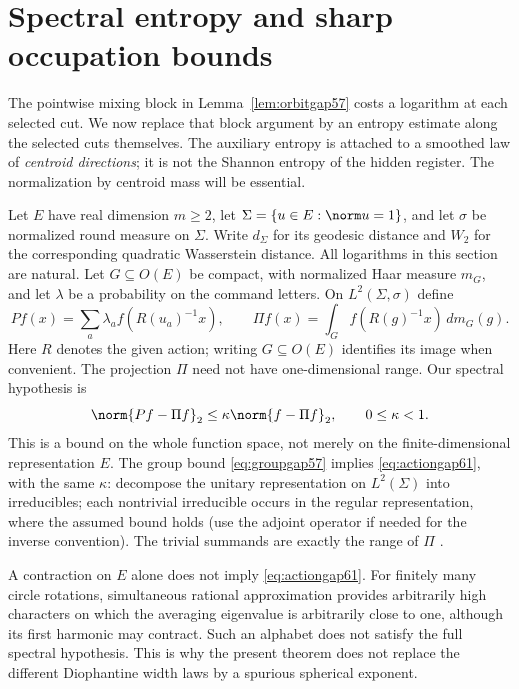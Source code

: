 \section{Spectral entropy and sharp occupation bounds}\label{sec:entropy61}
The pointwise mixing block in Lemma~\ref{lem:orbitgap57} costs a
logarithm at each selected cut. We now replace that block argument by an
entropy estimate along the selected cuts themselves. The auxiliary
entropy is attached to a smoothed law of \emph{centroid directions}; it
is not the Shannon entropy of the hidden register. The normalization by
centroid mass will be essential.

Let $E$ have real dimension $m\ge2$, let $\Sigma=\{u\in E:\norm u=1\}$,
and let $\sigma$ be normalized round measure on $\Sigma$. Write
$d_\Sigma$ for its geodesic distance and $W_2$ for the corresponding
quadratic Wasserstein distance. All logarithms in this section are
natural. Let $G\subseteq O(E)$ be compact, with normalized Haar measure
$m_G$, and let $\lambda$ be a probability on the command letters. On
$L^2(\Sigma,\sigma)$ define
\[
 Pf(x)=\sum_a\lambda_a f(R(u_a)^{-1}x),\qquad
 \Pi f(x)=\int_G f(R(g)^{-1}x)\,dm_G(g).
\]
Here $R$ denotes the given action; writing $G\subseteq O(E)$ identifies
its image when convenient. The projection $\Pi$ need not have
one-dimensional range. Our spectral hypothesis is
\begin{equation}\label{eq:actiongap61}
 \norm{Pf-\Pi f}_2\le\kappa\norm{f-\Pi f}_2,
                         \qquad 0\le\kappa<1.
\end{equation}
This is a bound on the whole function space, not merely on the
finite-dimensional representation $E$. The group bound
\eqref{eq:groupgap57} implies \eqref{eq:actiongap61}, with the same
$\kappa$: decompose the unitary representation on $L^2(\Sigma)$ into
irreducibles; each nontrivial irreducible occurs in the regular
representation, where the assumed bound holds (use the adjoint
operator if needed for the inverse convention). The trivial summands
are exactly the range of $\Pi$ \cite{Folland}.

\begin{remark}\label{rem:fullgap61}
A contraction on $E$ alone does not imply \eqref{eq:actiongap61}.
For finitely many circle rotations, simultaneous rational approximation
provides arbitrarily high characters on which the averaging eigenvalue
is arbitrarily close to one, although its first harmonic may contract.
Such an alphabet does not satisfy the full spectral hypothesis. This
is why the present theorem does not replace the different Diophantine
width laws by a spurious spherical exponent.
\end{remark}

